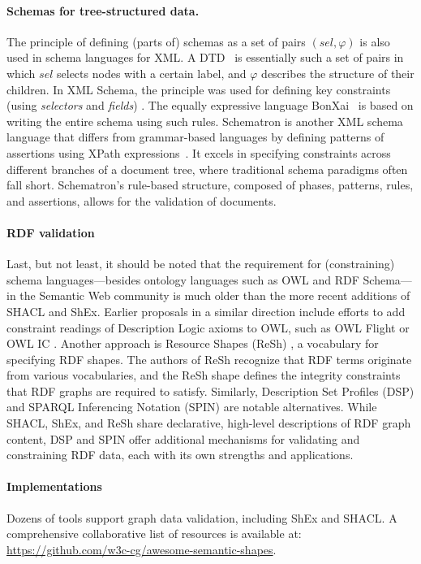 \paragraph{Schemas for tree-structured data.}

The principle of defining (parts of) schemas as a set of pairs $(sel,\varphi)$ is also used in schema languages for XML. A DTD~\cite{xml} is essentially such a set of pairs in which $sel$ selects nodes with a certain label, and $\varphi$ describes the structure of their children. In XML Schema, the principle was used for defining key constraints (using \emph{selectors} and \emph{fields}) \cite[Section~3.11.1]{xsd}. The equally expressive language BonXai~\cite{MNNS17} is based on writing the entire schema using such rules. Schematron \cite{schematron} is another XML schema language that differs from grammar-based languages by defining patterns of assertions using XPath expressions~\cite{xpath}. It excels in specifying constraints across different branches of a document tree, where traditional schema paradigms often fall short. Schematron's rule-based structure, composed of phases, patterns, rules, and assertions, allows for the validation of documents.

\paragraph{RDF validation}

Last, but not least, it should be noted that the requirement for (constraining) schema languages—besides ontology languages such as OWL and RDF Schema—in the Semantic Web community is much older than the more recent additions of SHACL and ShEx. Earlier proposals in a similar direction include efforts to add constraint readings of Description Logic axioms to OWL, such as OWL Flight \cite{BRP05} or OWL IC \cite{S10}. Another approach is Resource Shapes (ReSh) \cite{R14}, a vocabulary for specifying RDF shapes. The authors of ReSh recognize that RDF terms originate from various vocabularies, and the ReSh shape defines the integrity constraints that RDF graphs are required to satisfy. Similarly, Description Set Profiles (DSP) \cite{N08} and SPARQL Inferencing Notation (SPIN) \cite{KHI11} are notable alternatives. While SHACL, ShEx, and ReSh share declarative, high-level descriptions of RDF graph content, DSP and SPIN offer additional mechanisms for validating and constraining RDF data, each with its own strengths and applications.

\paragraph{Implementations}
Dozens of tools support graph data validation, including ShEx and SHACL. A comprehensive collaborative list of resources is available at:
\url{https://github.com/w3c-cg/awesome-semantic-shapes}.
